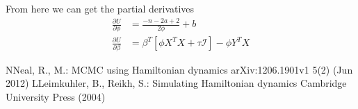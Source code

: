 \documentclass{article}
\numberwithin{equation}{section}
\begin{document}
From here we can get the partial derivatives
\begin{align*}
\frac{\partial U}{\partial \phi} &= \frac{-n - 2a + 2}{2\phi} + b\\
\frac{\partial U}{\partial \beta} &= \beta^T[\phi X^TX + \tau\mathcal{I}] - \phi Y^TX
\end{align*}
\begin{thebibliography}{99} %

\bibitem[1]NNeal, R., M.: MCMC using Hamiltonian dynamics 
\newblock arXiv:1206.1901v1 5(2)
(Jun 2012)
\bibitem[2]LLeimkuhler, B., Reikh, S.: Simulating Hamiltonian dynamics 
\newblock Cambridge University Press
(2004)
\end{thebibliography}
\end{document}
